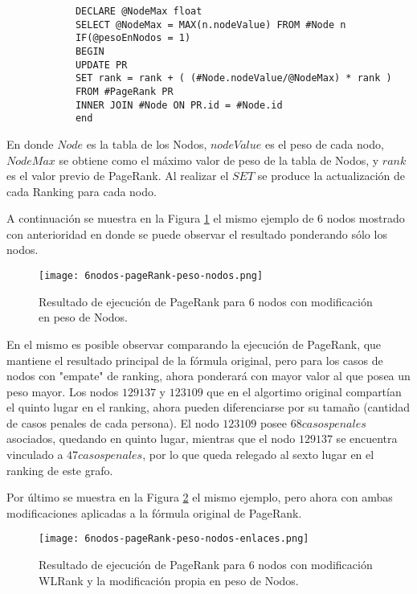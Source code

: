 \begin{scriptsize}{1}
	\tiny{
		\begin{verbatim}
			DECLARE @NodeMax float
			SELECT @NodeMax = MAX(n.nodeValue) FROM #Node n			
			IF(@pesoEnNodos = 1)
			BEGIN
			UPDATE PR 
			SET rank = rank + ( (#Node.nodeValue/@NodeMax) * rank )
			FROM #PageRank PR
			INNER JOIN #Node ON PR.id = #Node.id
			end
		\end{verbatim}
	}
\end{scriptsize}


En donde $Node$ es la tabla de los Nodos, $nodeValue$ es el peso de cada nodo, $NodeMax$ se obtiene como el máximo valor de peso de la tabla de Nodos, y $rank$ es el valor previo de PageRank. Al realizar el $SET$ se produce la actualización de cada Ranking para cada nodo. 

A continuación se muestra en la Figura \ref{fig:6nodos-pageRank-peso-nodos} el mismo ejemplo de 6 nodos mostrado con anterioridad en donde se puede observar el resultado ponderando sólo los nodos.

\begin{figure}
	\centering
	\texttt{[image: 6nodos-pageRank-peso-nodos.png]}
	\caption{Resultado de ejecución de PageRank para 6 nodos con modificación en peso de Nodos.} 
	\label{fig:6nodos-pageRank-peso-nodos}
\end{figure}

En el mismo es posible observar comparando la ejecución de PageRank, que mantiene el resultado principal de la fórmula original, pero para los casos de nodos con "empate" de ranking, ahora ponderará con mayor valor al que posea un peso mayor. Los nodos $129137$ y $123109$ que en el algortimo original compartían el quinto lugar en el ranking, ahora pueden diferenciarse por su tamaño (cantidad de casos penales de cada persona). El nodo $123109$ posee $68 casos penales$ asociados, quedando en quinto lugar, mientras que el nodo $129137$ se encuentra vinculado a $47 casos penales$, por lo que queda relegado al sexto lugar en el ranking de este grafo.

Por último se muestra en la Figura \ref{fig:6nodos-pageRank-peso-nodos-enlaces} el mismo ejemplo, pero ahora con ambas modificaciones aplicadas a la fórmula original de PageRank.

\begin{figure}
	\centering
	\texttt{[image: 6nodos-pageRank-peso-nodos-enlaces.png]}
	\caption{Resultado de ejecución de PageRank para 6 nodos con modificación WLRank y la modificación propia en peso de Nodos.} 
	\label{fig:6nodos-pageRank-peso-nodos-enlaces}
\end{figure}

